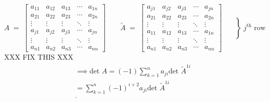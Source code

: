 \documentclass{report}
\begin{document}
{\[                      \] \[
                                A \;=\;
\begin{bmatrix}
a_{11} & a_{12} & a_{13} & \cdots & a_{1n}\\
a_{21} & a_{22} & a_{23} & \cdots & a_{2n}\\
\vdots & \vdots & \vdots & \ddots & \vdots\\
a_{j1} & a_{j2} & a_{j3} & \cdots & a_{jn}\\
\vdots & \vdots & \vdots & \ddots & \vdots\\
a_{n1} & a_{n2} & a_{n3} & \cdots & a_{nn}
\end{bmatrix}
\qquad
\widetilde{A} \;=\;
\left[
\begin{array}{ccccc}
a_{j1} & a_{j2} & a_{j3} & \cdots & a_{jn}\\
a_{21} & a_{22} & a_{23} & \cdots & a_{2n}\\
\vdots & \vdots & \vdots & \ddots & \vdots\\
a_{11} & a_{12} & a_{13} & \cdots & a_{1n}\\
\vdots & \vdots & \vdots & \ddots & \vdots\\
a_{n1} & a_{n2} & a_{n3} & \cdots & a_{nn}
\end{array}
\right]
\quad
\left.
\begin{array}{c}
\\[-1.2em]\\ \\ \\ \\[-0.6em]
\end{array}
\right\}
\; \text{\(j^{\text{th}}\) row}
                       \]      XXX FIX THIS XXX\\
        \begin{align*}
                \implies \text{det } A = \left( -1 \right) \sum\limits_{k=1}^{n} a_{ji} \text{det } \tilde{ A }   ^{1i}\\
                = \sum\limits_{k=1}^{n} \left( -1 \right) ^{i+2} a_{ji} \text{det } \tilde{ A }   ^{1i}\\
        .\end{align*}
        \nt{
                \begin{align*}
                        \text{det } \tilde{ A }   ^{11}= \text{det } \!
\left[
\begin{array}{cccc}
a_{22} & a_{23} & \cdots & a_{2n}\\
\vdots & \vdots & \ddots & \vdots\\
a_{12} & a_{13} & \cdots & a_{1n}\\

\end{array}
\end{align*}}}
\end{document}
